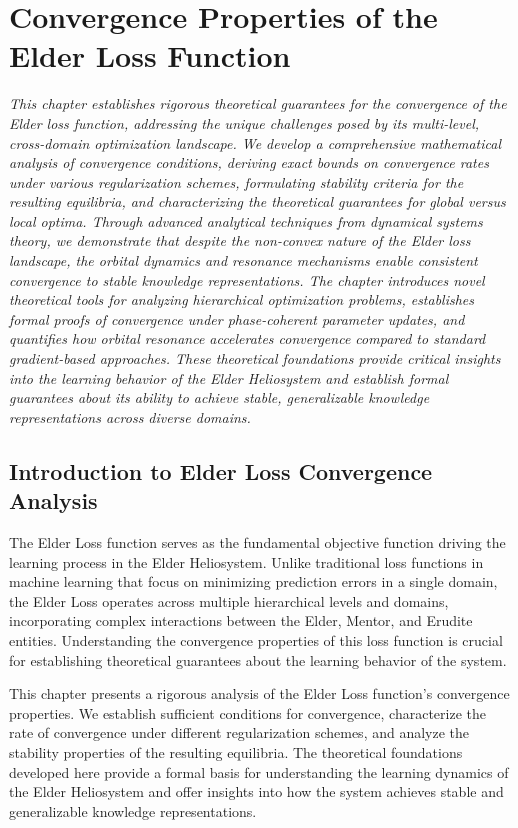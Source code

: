 \chapter{Convergence Properties of the Elder Loss Function}

\textit{This chapter establishes rigorous theoretical guarantees for the convergence of the Elder loss function, addressing the unique challenges posed by its multi-level, cross-domain optimization landscape. We develop a comprehensive mathematical analysis of convergence conditions, deriving exact bounds on convergence rates under various regularization schemes, formulating stability criteria for the resulting equilibria, and characterizing the theoretical guarantees for global versus local optima. Through advanced analytical techniques from dynamical systems theory, we demonstrate that despite the non-convex nature of the Elder loss landscape, the orbital dynamics and resonance mechanisms enable consistent convergence to stable knowledge representations. The chapter introduces novel theoretical tools for analyzing hierarchical optimization problems, establishes formal proofs of convergence under phase-coherent parameter updates, and quantifies how orbital resonance accelerates convergence compared to standard gradient-based approaches. These theoretical foundations provide critical insights into the learning behavior of the Elder Heliosystem and establish formal guarantees about its ability to achieve stable, generalizable knowledge representations across diverse domains.}

\section{Introduction to Elder Loss Convergence Analysis}

The Elder Loss function serves as the fundamental objective function driving the learning process in the Elder Heliosystem. Unlike traditional loss functions in machine learning that focus on minimizing prediction errors in a single domain, the Elder Loss operates across multiple hierarchical levels and domains, incorporating complex interactions between the Elder, Mentor, and Erudite entities. Understanding the convergence properties of this loss function is crucial for establishing theoretical guarantees about the learning behavior of the system.

This chapter presents a rigorous analysis of the Elder Loss function's convergence properties. We establish sufficient conditions for convergence, characterize the rate of convergence under different regularization schemes, and analyze the stability properties of the resulting equilibria. The theoretical foundations developed here provide a formal basis for understanding the learning dynamics of the Elder Heliosystem and offer insights into how the system achieves stable and generalizable knowledge representations.

